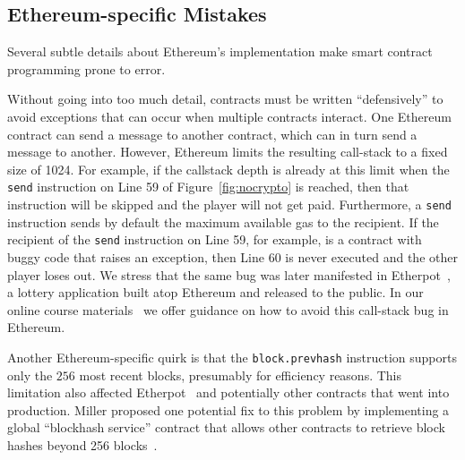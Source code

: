 \documentclass{llncs}
\renewcommand{\paragraph}[1]{\vspace{5pt} \noindent{\bf #1}}
\begin{document}
\subsection{Ethereum-specific Mistakes}
Several subtle details about Ethereum's implementation make smart contract programming prone to error. 

\paragraph{Call-stack bug.}
Without going into too much detail, contracts must be written ``defensively'' to avoid exceptions that can occur when multiple contracts interact. One Ethereum contract can send a message to another contract, which can in turn send a message to another. However, Ethereum limits the resulting call-stack to a fixed size of 1024. For example, if the callstack depth is already at this limit when the \texttt{send} instruction on Line 59 of Figure~\ref{fig:nocrypto} is reached, then that instruction will be skipped and the player will not get paid. Furthermore, a \texttt{send} instruction sends by default the maximum available gas to the recipient. If the recipient of the \texttt{send} instruction on Line 59, for example, is a contract with buggy code that raises an exception, then Line 60 is never executed and the other player loses out. 
We stress that 
the same 
bug was later manifested in Etherpot~\cite{etherpot}, a lottery application built atop Ethereum and released to the public.
In our online course materials~\cite{anonymousethlab} we offer guidance on  
how to avoid this call-stack bug in Ethereum.

\paragraph{Blockhash bug.}
Another Ethereum-specific quirk is that 
the {\tt block.prevhash} instruction supports only the $256$ most recent blocks, presumably
for efficiency reasons.
This limitation also affected 
Etherpot~\cite{etherpot} and potentially other contracts that went into production.
Miller proposed one potential fix 
to this problem by implementing a global ``blockhash service'' contract that allows
other contracts to retrieve block hashes beyond 256 blocks~\cite{ethblockhashes}. 
\end{document}
